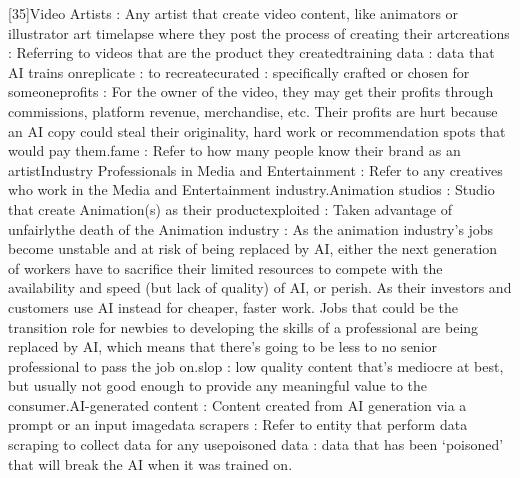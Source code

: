 [35]Video Artists : Any artist that create video content, like animators or illustrator art timelapse where they post the process of creating their art\newline
[36]creations : Referring to videos that are the product they created\newline
[37]training data : data that AI trains on\newline
[38]replicate : to recreate\newline
[39]curated : specifically crafted or chosen for someone\newline
[40]profits : For the owner of the video, they may get their profits through commissions, platform revenue, merchandise, etc. Their profits are hurt because an AI copy could steal their originality, hard work or recommendation spots that would pay them.\newline
[41]fame : Refer to how many people know their brand as an artist\newline
[42]Industry Professionals in Media and Entertainment : Refer to any creatives who work in the Media and Entertainment industry.\newline
[43]Animation studios : Studio that create Animation(s) as their product\newline
[44]exploited : Taken advantage of unfairly\newline
[45]the death of the Animation industry : As the animation industry’s jobs become unstable and at risk of being replaced by AI, either the next generation of workers have to sacrifice their limited resources to compete with the availability and speed (but lack of quality) of AI, or perish. As their investors and customers use AI instead for cheaper, faster work. Jobs that could be the transition role for newbies to developing the skills of a professional are being replaced by AI, which means that there’s going to be less to no senior professional to pass the job on.\newline
[46]slop : low quality content that’s mediocre at best, but usually not good enough to provide any meaningful value to the consumer.\newline
[47]AI-generated content : Content created from AI generation via a prompt or an input image\newline
[48]data scrapers : Refer to entity that perform data scraping to collect data for any use\newline
[49]poisoned data : data that has been ‘poisoned’ that will break the AI when it was trained on.\newline
